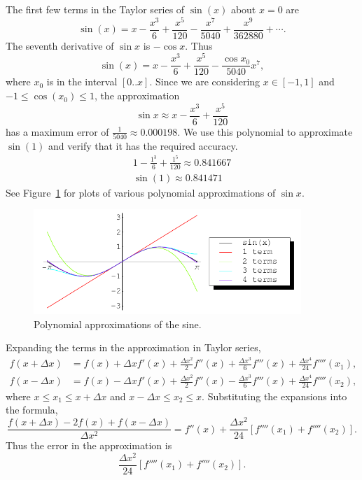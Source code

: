 \begin{Solution}
  \label{solution polynomial approximation sin x}
  The first few terms in the Taylor series of $\sin(x)$ about $x = 0$ are
  \[
  \sin(x) = x - \frac{x^3}{6} + \frac{x^5}{120} - \frac{x^7}{5040}
  + \frac{x^9}{362880} + \cdots.
  \]
  The seventh derivative of $\sin x$ is $-\cos x$.  Thus 
  \[
  \sin(x) = x - \frac{x^3}{6} + \frac{x^5}{120} - \frac{\cos x_0}{5040} x^7,
  \]
  where $x_0$ is in the interval $[0 .. x]$.  
  Since we are considering $x \in [-1,1]$ and
  $-1 \leq \cos(x_0) \leq 1$, the approximation
  \[
  \boxed{
    \sin x \approx x - \frac{x^3}{6} + \frac{x^5}{120}
    }
  \]
  has a maximum error of $\frac{1}{5040} \approx 0.000198$.
  We use this polynomial to approximate $\sin(1)$
  and verify that it has the required accuracy.
  \begin{gather*}
    \boxed{
      1 - \frac{1^3}{6} + \frac{1^5}{120} \approx 0.841667
    }
    \\
    \sin(1) \approx 0.841471
  \end{gather*}
  See Figure~\ref{figure sin-app} for plots of various polynomial 
  approximations of $\sin x$.
  \begin{figure}[tb]
    \begin{center}
      \includegraphics[width=0.9\textwidth]{calculus/differential/sin-app}
    \end{center}
    \caption{Polynomial approximations of the sine.}
    \label{figure sin-app}
  \end{figure}
\end{Solution}




\begin{Solution}
  \label{solution second difference centered}
  Expanding the terms in the approximation in Taylor series,
  \begin{align*}
    f(x+\Delta x) &= f(x) + \Delta x f'(x) + \frac{\Delta x^2}{2} f''(x)
    +\frac{\Delta x^3}{6} f'''(x) + \frac{\Delta x^4}{24} f''''(x_1), \\
    f(x-\Delta x) &= f(x) - \Delta x f'(x) + \frac{\Delta x^2}{2} f''(x)
    -\frac{\Delta x^3}{6} f'''(x) + \frac{\Delta x^4}{24} f''''(x_2),
  \end{align*}
  where $x \leq x_1 \leq x + \Delta x$ and $x - \Delta x \leq x_2 \leq x$.
  Substituting the expansions into the formula,
  \[
  \frac{f(x+\Delta x) - 2 f(x) + f(x-\Delta x)}{\Delta x^2}
  = f''(x) + \frac{\Delta x^2}{24} [f''''(x_1) + f''''(x_2)].
  \]
  Thus the error in the approximation is
  \[
  \boxed{
    \frac{\Delta x^2}{24} [f''''(x_1) + f''''(x_2)].
    }
  \]
\end{Solution}




